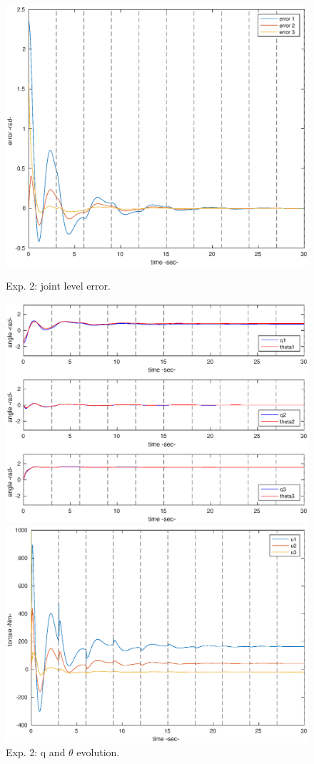 \begin{center}
\begin{figure}[h!]
\begin{minipage}[h!]{0.45\linewidth}
\includegraphics[scale=0.35]{figures/2_1_error.eps}
\caption{\label{2_1err}
Exp. 2: joint level error.}
\includegraphics[scale=0.35]{figures/2_1_qtheta.eps}
\caption{\label{2_1qt}
Exp. 2: q and \(\theta\) evolution.}
\includegraphics[scale=0.35]{figures/2_1_ceff.eps}

\end{minipage}
\end{figure}
\end{center}
